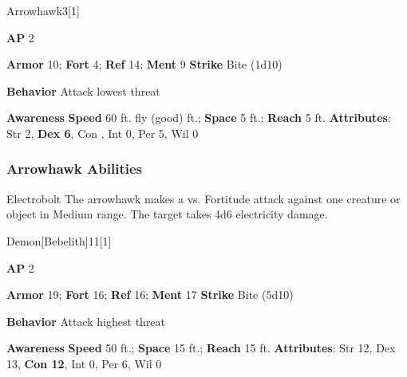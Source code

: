 \begin{monsection}{Arrowhawk}{3}[1]
\vspace{-1em}\vspace{-1em}
\begin{spellcontent}
\begin{spelltargetinginfo}
{\textbf{AP} 2}

\pari \textbf{Armor} 10;
\textbf{Fort} 4;
\textbf{Ref} 14;
\textbf{Ment} 9
\pari \textbf{Strike} Bite  (1d10)



\pari \textbf{Behavior} Attack lowest threat
\end{spelltargetinginfo}
\end{spellcontent}

\begin{monsterfooter}
\pari \textbf{Awareness} 
\pari \textbf{Speed} 60 ft. fly (good) ft.;
\textbf{Space} 5 ft.;
\textbf{Reach} 5 ft.
\pari \textbf{Attributes}:
Str 2,
\textbf{Dex 6},
Con ,
Int 0,
Per 5,
Wil 0
\end{monsterfooter}
\end{monsection}


\subsubsection{Arrowhawk Abilities}

\begin{ability}{Electrobolt}
The arrowhawk makes a  vs. Fortitude attack against one creature or object in Medium range.
\hit The target takes 4d6 electricity damage.
\end{ability}

\begin{monsection}{Demon}[Bebelith]{11}[1]
\vspace{-1em}\vspace{-1em}
\begin{spellcontent}
\begin{spelltargetinginfo}
{\textbf{AP} 2}

\pari \textbf{Armor} 19;
\textbf{Fort} 16;
\textbf{Ref} 16;
\textbf{Ment} 17
\pari \textbf{Strike} Bite  (5d10)



\pari \textbf{Behavior} Attack highest threat
\end{spelltargetinginfo}
\end{spellcontent}

\begin{monsterfooter}
\pari \textbf{Awareness} 
\pari \textbf{Speed} 50 ft.;
\textbf{Space} 15 ft.;
\textbf{Reach} 15 ft.
\pari \textbf{Attributes}:
Str 12,
Dex 13,
\textbf{Con 12},
Int 0,
Per 6,
Wil 0
\end{monsterfooter}
\end{monsection}


